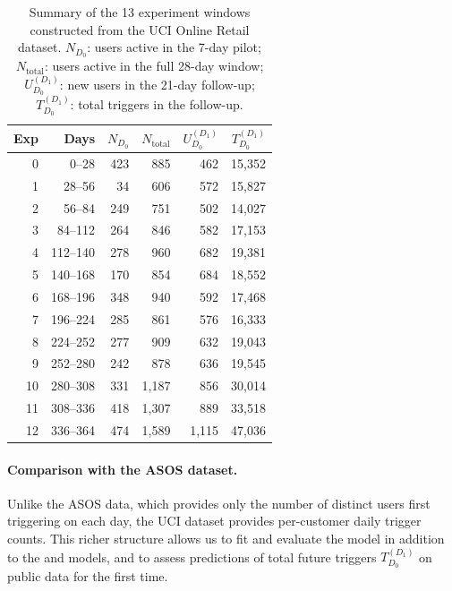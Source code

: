 \begin{table}[t]
\centering
\caption{Summary of the 13 experiment windows constructed from the
UCI Online Retail dataset.
$N_{D_0}$: users active in the 7-day pilot;
$N_{\mathrm{total}}$: users active in the full 28-day window;
$U_{D_0}^{(D_1)}$: new users in the 21-day follow-up;
$T_{D_0}^{(D_1)}$: total triggers in the follow-up.}
\label{tab:uci_experiments}
\small
\begin{tabular}{rrrrrr}
\toprule
Exp & Days & $N_{D_0}$ & $N_{\mathrm{total}}$ & $U_{D_0}^{(D_1)}$ & $T_{D_0}^{(D_1)}$ \\
\midrule
0  & 0--28   & 423 & 885   & 462   & 15{,}352 \\
1  & 28--56  & 34  & 606   & 572   & 15{,}827 \\
2  & 56--84  & 249 & 751   & 502   & 14{,}027 \\
3  & 84--112 & 264 & 846   & 582   & 17{,}153 \\
4  & 112--140 & 278 & 960  & 682   & 19{,}381 \\
5  & 140--168 & 170 & 854  & 684   & 18{,}552 \\
6  & 168--196 & 348 & 940  & 592   & 17{,}468 \\
7  & 196--224 & 285 & 861  & 576   & 16{,}333 \\
8  & 224--252 & 277 & 909  & 632   & 19{,}043 \\
9  & 252--280 & 242 & 878  & 636   & 19{,}545 \\
10 & 280--308 & 331 & 1{,}187 & 856 & 30{,}014 \\
11 & 308--336 & 418 & 1{,}307 & 889 & 33{,}518 \\
12 & 336--364 & 474 & 1{,}589 & 1{,}115 & 47{,}036 \\
\bottomrule
\end{tabular}
\end{table}

\paragraph{Comparison with the ASOS dataset.}
Unlike the ASOS data, which provides only the number of distinct
users first triggering on each day, the UCI dataset provides
per-customer daily trigger counts.
This richer structure allows us to fit and evaluate the
\nbmodel model in addition to the \bemodel and \tgmodel models,
and to assess predictions of total future triggers
$T_{D_0}^{(D_1)}$ on public data for the first time.
